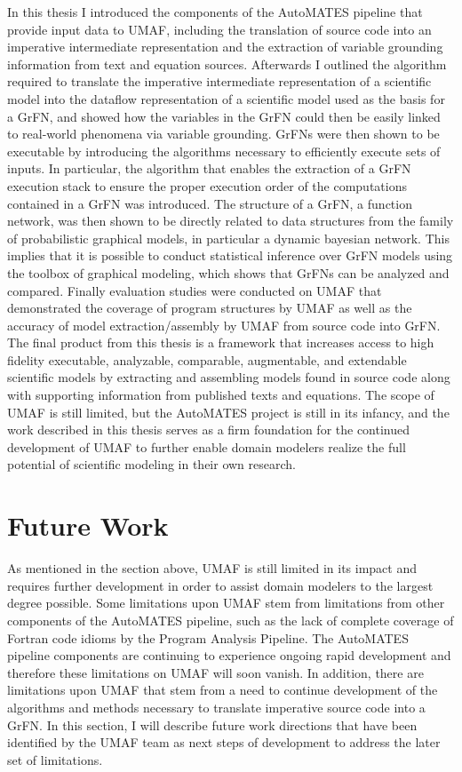 In this thesis I introduced the components of the AutoMATES pipeline that provide input data to UMAF, including the translation of source code into an imperative intermediate representation and the extraction of variable grounding information from text and equation sources.
Afterwards I outlined the algorithm required to translate the imperative intermediate representation of a scientific model into the dataflow representation of a scientific model used as the basis for a GrFN, and showed how the variables in the GrFN could then be easily linked to real-world phenomena via variable grounding.
GrFNs were then shown to be executable by introducing the algorithms necessary to efficiently execute sets of inputs.
In particular, the algorithm that enables the extraction of a GrFN execution stack to ensure the proper execution order of the computations contained in a GrFN was introduced.
The structure of a GrFN, a function network, was then shown to be directly related to data structures from the family of probabilistic graphical models, in particular a dynamic bayesian network.
This implies that it is possible to conduct statistical inference over GrFN models using the toolbox of graphical modeling, which shows that GrFNs can be analyzed and compared.
Finally evaluation studies were conducted on UMAF that demonstrated the coverage of program structures by UMAF as well as the accuracy of model extraction/assembly by UMAF from source code into GrFN.
The final product from this thesis is a framework that increases access to high fidelity executable, analyzable, comparable, augmentable, and extendable scientific models by extracting and assembling models found in source code along with supporting information from published texts and equations.
The scope of UMAF is still limited, but the AutoMATES project is still in its infancy, and the work described in this thesis serves as a firm foundation for the continued development of UMAF to further enable domain modelers realize the full potential of scientific modeling in their own research.


\section{Future Work\label{sec:future_work}}
As mentioned in the section above, UMAF is still limited in its impact and requires further development in order to assist domain modelers to the largest degree possible.
Some limitations upon UMAF stem from limitations from other components of the AutoMATES pipeline, such as the lack of complete coverage of Fortran code idioms by the Program Analysis Pipeline.
The AutoMATES pipeline components are continuing to experience ongoing rapid development and therefore these limitations on UMAF will soon vanish.
In addition, there are limitations upon UMAF that stem from a need to continue development of the algorithms and methods necessary to translate imperative source code into a GrFN.
In this section, I will describe future work directions that have been identified by the UMAF team as next steps of development to address the later set of limitations.


